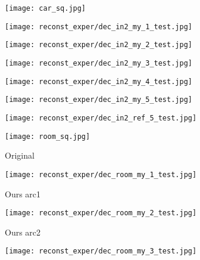 \begin{figure}[H]
	\centering
	\begin{subfigure}[b]{0.13\linewidth}
		\texttt{[image: car\_sq.jpg]} %
	\end{subfigure}
	\begin{subfigure}[b]{0.13\linewidth}
		\texttt{[image: reconst\_exper/dec\_in2\_my\_1\_test.jpg]} %
	\end{subfigure}
	\begin{subfigure}[b]{0.13\linewidth}
		\texttt{[image: reconst\_exper/dec\_in2\_my\_2\_test.jpg]} %
	\end{subfigure}
	\begin{subfigure}[b]{0.13\linewidth}
		\texttt{[image: reconst\_exper/dec\_in2\_my\_3\_test.jpg]} %
	\end{subfigure}
	\begin{subfigure}[b]{0.13\linewidth}
		\texttt{[image: reconst\_exper/dec\_in2\_my\_4\_test.jpg]} %
	\end{subfigure}
	\begin{subfigure}[b]{0.13\linewidth}
		\texttt{[image: reconst\_exper/dec\_in2\_my\_5\_test.jpg]} %
	\end{subfigure}
	\begin{subfigure}[b]{0.13\linewidth}
		\texttt{[image: reconst\_exper/dec\_in2\_ref\_5\_test.jpg]} %
	\end{subfigure}
	\centering
	\begin{subfigure}[b]{0.13\linewidth}
		\texttt{[image: room\_sq.jpg]} %
		\caption{Original}
	\end{subfigure}
	\begin{subfigure}[b]{0.13\linewidth}
		\texttt{[image: reconst\_exper/dec\_room\_my\_1\_test.jpg]} %
		\caption{Ours arc1}
	\end{subfigure}
	\begin{subfigure}[b]{0.13\linewidth}
		\texttt{[image: reconst\_exper/dec\_room\_my\_2\_test.jpg]} %
		\caption{Ours arc2}
	\end{subfigure}
	\begin{subfigure}[b]{0.13\linewidth}
		\texttt{[image: reconst\_exper/dec\_room\_my\_3\_test.jpg]} %

\end{subfigure}
\end{figure}
